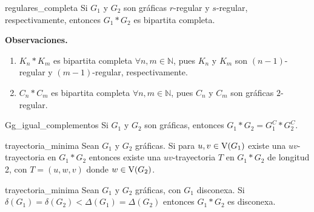 \documentclass[fleqn, 11pt]{beamer}
\begin{document}
    \begin{corolario}[beforeafter skip = 4mm]{}{regulares_completa}
        Si $ G_1 $ y $ G_2 $ son gráficas $ r $-regular y $ s $-regular, respectivamente, entonces $ G_1 \ast G_2 $ es bipartita completa.
    \end{corolario}

    \textbf{Observaciones.}

    \begin{enumerate}
        \item $ K_n \ast K_m $ es bipartita completa $ \forall n, m \in \mathbb{N} $, pues $ K_n $ y $ K_m $ son $ (n-1) $-regular y $ (m-1) $-regular, respectivamente.
        \item $ C_n \ast C_m $ es bipartita completa $ \forall n, m \in \mathbb{N} $, pues $ C_n $ y $ C_m $ son gráficas $ 2 $-regular.
    \end{enumerate} \vspace{1mm}

    \begin{teorema}[beforeafter skip = 4mm]{}{Gg_igual_complementos}
        Si $ G_1 $ y $ G_2 $ son gráficas, entonces $ G_1 \ast G_2 = G_1^C \ast G_2^C $.
    \end{teorema}

    \begin{teorema}[beforeafter skip = 4mm]{}{trayectoria_minima}
        Sean $ G_1 $ y $ G_2 $ gráficas. Si para $ u,v \in \textnormal{V}(G_1) $ existe una $ uv $-trayectoria en $ G_1 \ast G_2 $ entonces existe una $ uv $-trayectoria $ T $ en $ G_1 \ast G_2 $ de longitud 2, con $ T = (u,w,v) $ donde $ w \in \textnormal{V}(G_2) $.
    \end{teorema}

    \begin{teorema}[beforeafter skip = 4mm]{}{trayectoria_minima}
        Sean $ G_1 $ y $ G_2 $ gráficas, con $ G_1 $ disconexa. Si $ \delta(G_1) = \delta(G_2) < \Delta(G_1) = \Delta(G_2) $ entonces $ G_1 \ast G_2 $ es disconexa.
    \end{teorema}
\end{document}
